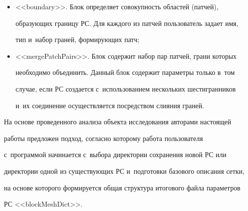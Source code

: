 \begin{enumerate}[(1)]
\begin{itemize}
Каж\-до\-му шестиграннику (ключевое слово <<hex>>) соответствуют~8~меток 


вершин, число ячеек для каждого из трех направлений ($x_1, x_2, x_3$) 


и~степень расширения ячеек применительно к~каждому направлению, 


которая позволяет <<разбить>> сетку в~каждом из направлений. В~версиях 


ПС OpenFOAM начиная с~2.4 предусмотрена опция мультиградуировки, 


отвечающая за разбиение шестигранника в~одном из трех направлений на 


совокупность секторов и~определение параметров градуировки в~каждом 


секторе;


\item <<boundary>>. Блок определяет совокупность областей (патчей), 


обра\-зу\-ющих границу РС. Для каждого из патчей пользователь задает имя, 


тип и~набор граней, формирующих патч; 


\item <<mergePatchPairs>>. Блок содержит набор пар патчей, грани которых 


необходимо объединить. Данный блок содержит параметры только в~том 


случае, если РС создается с~использованием нескольких шестигранников 


и~их соединение осуществляется посредством слияния граней.


\end{itemize}


\end{enumerate}





   На основе проведенного анализа объекта исследования авторами настоящей 


работы предложен подход, согласно которому работа пользователя 


с~программой начинается с~выбора директории сохранения новой РС или 


директории одной из существующих РС и~подготовки базового описания сетки, 


на основе которого формируется общая структура итогового файла параметров 


РС <<\mbox{blockMeshDict}>>. 



